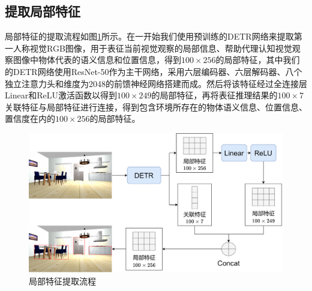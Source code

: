 \subsection{提取局部特征}
局部特征的提取流程如图\ref{局部特征提取}所示。在一开始我们使用预训练的DETR网络来提取第一人称视觉RGB图像，用于表征当前视觉观察的局部信息、帮助代理认知视觉观察图像中物体代表的语义信息和位置信息，得到$100 \times 256$的局部特征，其中我们的DETR网络使用ResNet-50作为主干网络，采用六层编码器、六层解码器、八个独立注意力头和维度为2048的前馈神经网络搭建而成。然后将该特征经过全连接层Linear和ReLU激活函数以得到$100 \times 249$的局部特征，再将表征推理结果的$100 \times 7$关联特征与局部特征进行连接，得到包含环境所存在的物体语义信息、位置信息、置信度在内的$100 \times 256$的局部特征。
\begin{figure}[htbp]
    \centering
    \includegraphics[scale=0.09]{Fig/局部特征提取.png}
    \caption{\label{局部特征提取}局部特征提取流程}
\end{figure}

